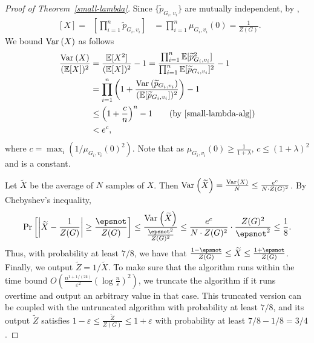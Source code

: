 \documentclass[10pt,a4paper]{article}
\newcommand{\Ex}{\mathop{\mathbb{{}E}}\nolimits}
\renewcommand{\Pr}{\mathop{\mathrm{Pr}}\nolimits}
\newcommand{\abs}[1]{\ensuremath{\left\vert#1\right\vert}}
\newcommand{\eps}{\varepsilon}
\newcommand{\Var}[2]{\ensuremath{\textnormal{Var}_{#1}\left(#2\right)}}
\begin{document}
\begin{proof}[Proof of Theorem~\ref{small-lambda}]
  Since $\{\widetilde{p}_{G_i,v_i}\}$ are mutually independent, by ,
  \begin{align*}
    \Ex[X]=\Ex\left[\prod_{i=1}^n\widetilde{p}_{G_i,v_i}\right] & = \prod_{i=1}^n\mu_{G_i,v_i}(0)=\frac{1}{Z(G)}.
  \end{align*}
  We bound $\Var{}{X}$ as follows
  \begin{align*}
    \frac{\Var{}{X}}{(\Ex[X])^2}&=\frac{\Ex[X^2]}{(\Ex[X])^2}-1 = \frac{\prod_{i=1}^n\Ex[\widetilde{p}_{G_i,v_i}^2]}{\prod_{i=1}^n\Ex[\widetilde{p}_{G_i,v_i}]^2}-1\\
    &=\prod_{i=1}^n\left(1+\frac{\Var{}{\widetilde{p}_{G_i,v_i}}}{(\Ex[\widetilde{p}_{G_i,v_i}])^2}\right)-1\\
    &\leq\left(1+\frac{c}{n}\right)^n-1\tag*{(by \Cref{small-lambda-alg})}\\
    &<e^{c},
  \end{align*}
  where $c=\max_i(1/\mu_{G_i,v_i}(0)^2)$. 
  Note that as $\mu_{G_i,v_i}(0)\ge \frac{1}{1+\lambda}$, $c\le (1+\lambda)^2$ and is a constant.

  Let $\widetilde{X}$ be the average of $N$ samples of $X$.
  Then $\Var{}{\widetilde{X}} = \frac{\Var{}{X}}{N} \le \frac{e^{c}}{N\cdot Z(G)^2}$.
  By Chebyshev's inequality,
  \begin{align*}
    \Pr\left[\abs{\widetilde{X}-\frac{1}{Z(G)}}\ge\frac{\epsnot}{Z(G)}\right]\le\frac{\Var{}{\widetilde{X}}}{\frac{\epsnot^2}{Z(G)^2}} 
    \le \frac{e^{c}}{N\cdot Z(G)^2} \cdot \frac{Z(G)^2}{\epsnot^2}\le \frac{1}{8}.
  \end{align*}
  Thus, with probability at least $7/8$,
  we have that $\frac{1-\epsnot}{Z(G)}\le \widetilde{X} \le \frac{1+\epsnot}{Z(G)}$.
  Finally, we output $\widetilde{Z}=1/\widetilde{X}$.
  To make sure that the algorithm runs within the time bound $O\left(\frac{n^{1+1/(2k)}}{\eps^2}(\log \frac{n}{\eps})^2\right)$, 
  we truncate the algorithm if it runs overtime and output an arbitrary value in that case.
  This truncated version can be coupled with the untruncated algorithm with probability at least $7/8$,
  and its output $\widetilde{Z}$ satisfies $1-\eps\le \frac{\widetilde{Z}}{Z(G)}\le 1+\eps$ with probability at least $7/8-1/8=3/4$.


\end{proof}
\end{document}
